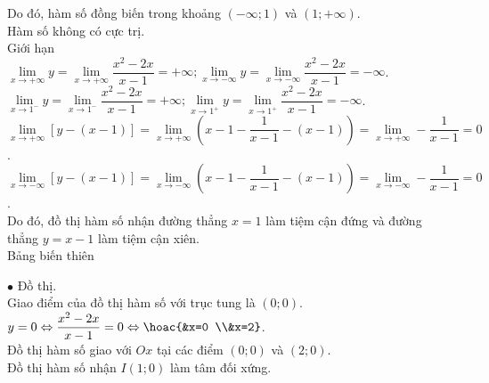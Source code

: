 \begin{bt}
{\begin{enumerate}[a)]
			Do đó, hàm số đồng biến trong khoảng $\left(-\infty;1 \right)$ và $\left(1;+\infty \right)$. \\
			Hàm số không có cực trị.\\
			Giới hạn \\ 
			$\underset{x\to +\infty}{\mathop{\lim}}y=\underset{x\to +\infty}{\mathop{\lim}}\dfrac{x^2-2x}{x-1}=+\infty;\underset{x\to -\infty}{\mathop{\lim}}y=\underset{x\to -\infty}{\mathop{\lim}}\dfrac{x^2-2x}{x-1}=-\infty$. \\ 
			$\underset{x\to{1^{-}}}{\mathop{\lim}}y=\underset{x\to{1^{-}}}{\mathop{\lim}}\dfrac{x^2-2x}{x-1}=+\infty;\underset{x\to{1^{+}}}{\mathop{\lim}}y=\underset{x\to{1^{+}}}{\mathop{\lim}}\dfrac{x^2-2x}{x-1}=-\infty$. \\ 
			$\underset{x\to +\infty}{\mathop{\lim}}[y-(x-1)]=\underset{x\to +\infty}{\mathop{\lim}}\left(x-1-\dfrac{1}{x-1}-(x-1)\right)=\underset{x\to +\infty}{\mathop{\lim}}-\dfrac{1}{x-1}=0$. \\ 
			$\underset{x\to -\infty}{\mathop{\lim}}[y-(x-1)]=\underset{x\to -\infty}{\mathop{\lim}}\left(x-1-\dfrac{1}{x-1}-(x-1)\right)=\underset{x\to -\infty}{\mathop{\lim}}-\dfrac{1}{x-1}=0$. \\ 
			Do đó, đồ thị hàm số nhận đường thẳng $x=1$ làm tiệm cận đứng và đường thẳng $y=x-1$ làm tiệm cận xiên.\\
			Bảng biến thiên
			\begin{center}
			\end{center}
			$\bullet$ Đồ thị. \\ 
			Giao điểm của đồ thị hàm số với trục tung là $\left(0;0 \right)$.\\
			$y=0\Leftrightarrow \dfrac{x^2-2x}{x-1}=0\Leftrightarrow \hoac{&x=0 \\&x=2}$.\\
			Đồ thị hàm số giao với $Ox$ tại các điểm $\left(0;0 \right)$ và $\left(2;0\right)$.\\
			Đồ thị hàm số nhận $I\left(1; 0 \right)$ làm tâm đối xứng.

\end{enumerate}}
\end{bt}
